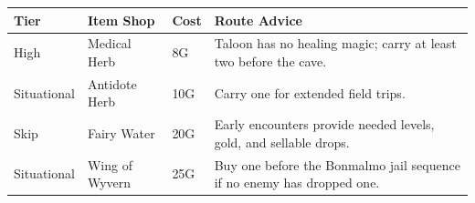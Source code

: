 \documentclass[
  american,
  10pt,
  letterpaper,
  oneside,
  open=any]{scrreprt}
\newcounter{none} %
\newenvironment{guidetable}{%
  \small\setstretch{1.0}%
  \setlength{\tabcolsep}{4pt}%
  \setlength{\LTpre}{8pt}\setlength{\LTpost}{10pt}%
  \renewcommand{\arraystretch}{1.16}%
}{ }
\begin{document}
\begin{guidetable}

{\def\LTcaptype{none} %
\begin{longtable}[]{@{}
  >{\raggedright\arraybackslash}p{}
  >{\raggedright\arraybackslash}p{}
  >{\raggedleft\arraybackslash}p{}
  >{\raggedright\arraybackslash}p{}@{}}
\toprule\noalign{}
\begin{minipage}[b]{\linewidth}\raggedright
\color{GuideGreen}\bfseries Tier
\end{minipage} & \begin{minipage}[b]{\linewidth}\raggedright
\color{GuideGreen}\bfseries Item Shop
\end{minipage} & \begin{minipage}[b]{\linewidth}\raggedleft
\color{GuideGreen}\bfseries Cost
\end{minipage} & \begin{minipage}[b]{\linewidth}\raggedright
\color{GuideGreen}\bfseries Route Advice
\end{minipage} \\
\midrule\noalign{}
\endhead
\bottomrule\noalign{}
\endlastfoot
High & Medical Herb & 8G & Taloon has no healing magic; carry at least
two before the cave. \\
Situational & Antidote Herb & 10G & Carry one for extended field
trips. \\
Skip & Fairy Water & 20G & Early encounters provide needed levels, gold,
and sellable drops. \\
Situational & Wing of Wyvern & 25G & Buy one before the Bonmalmo jail
sequence if no enemy has dropped one. \\
\end{longtable}
}

\end{guidetable}
\end{document}
